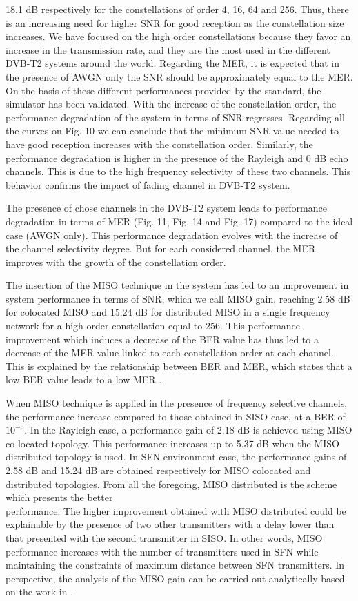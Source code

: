 \documentclass[10pt, conference]{IEEEtran}
\begin{document}
\linespread{1.08}
\normalsize{
18.1 dB respectively for the constellations of order 4, 16, 64 and 256. Thus, there is an increasing need for higher SNR for good reception as the constellation size increases. We have focused on the high order constellations because they favor an increase in the transmission rate, and they are the most used in the different DVB-T2 systems around the world. Regarding the MER, it is expected that in the presence of AWGN only the SNR should be approximately equal to the MER. On the basis of these different performances provided by the standard, the simulator has been validated. With the increase of the constellation order, the performance degradation of the system in terms of SNR regresses. Regarding all the curves on Fig. 10 we can conclude that the minimum SNR value needed to have  good reception increases with the constellation order. Similarly, the performance degradation is higher in the presence of the Rayleigh and 0 dB echo channels. This is due to the high frequency selectivity of these two channels. This behavior confirms the impact of fading channel in DVB-T2 system.

The presence of chose channels in the DVB-T2 system leads to performance degradation in terms of MER (Fig. 11, Fig. 14 and Fig. 17) compared to the ideal case (AWGN only). This performance degradation evolves with the increase of the channel selectivity degree. But for each considered channel, the MER improves with the growth of the constellation order.

The insertion of the MISO technique in the system has led to an improvement in system performance in terms of SNR, which we call MISO gain, reaching 2.58 dB for colocated MISO and 15.24 dB for distributed MISO in a single frequency network for a high-order constellation equal to 256. This performance improvement which induces a decrease of the BER value has thus led to a decrease of the MER value linked to each constellation order at each channel. This is explained by the relationship between BER and MER, which states that a low BER value leads to a low MER \cite{3}.

When MISO technique is applied in the presence of frequency selective channels, the performance increase compared to those obtained in SISO case, at a BER of $10^{-5}$. In the Rayleigh case, a performance gain of 2.18 dB is achieved using MISO co-located topology. This performance increases up to 5.37 dB when the MISO distributed topology is used. In SFN environment case, the performance gains of 2.58 dB and 15.24 dB are obtained respectively for MISO colocated and distributed topologies. From all the foregoing, MISO distributed is the scheme which presents the better\\
performance. The higher improvement obtained with MISO distributed could be explainable by the presence of two other transmitters with a delay lower than that presented with the second transmitter in SISO. In other words, MISO performance increases with the number of transmitters used in SFN while maintaining the constraints of maximum distance between SFN transmitters. In perspective, the analysis of the MISO gain can be carried out analytically based on the work in \cite{1}.

}
\end{document}
